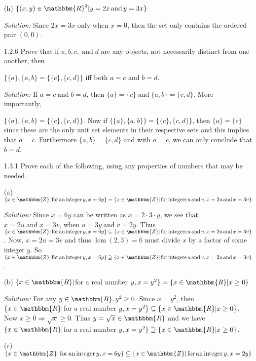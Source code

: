 \documentclass{letter}
\newcommand{\tmop}[1]{\ensuremath{\operatorname{#1}}}
\newcommand{\tmtextit}[1]{{\itshape{#1}}}
\begin{document}
(h) $\{(x, y) \in \mathbbm{R}^2 | y = 2 x \tmop{and} y = 3 x\}$

\tmtextit{Solution:} Since $2 x = 3 x$ only when $x = 0$, then the set only
contains the ordered pair $(0, 0)$.

1.2.6 Prove that if $a, b, c, \tmop{and} d$ are any objects, not necessarily
distinct from one another, then

$\{\{a\}, \{a, b\}=\{\{c\}, \{c, d\}\}$ iff both $a = c$ and $b = d$.

\tmtextit{Solution:} If $a = c \tmop{and} b = d$, then $\{a\}=\{c\} \tmop{and}
\{a, b\}=\{c, d\}$. More importantly,

$\{\{a\}, \{a, b\}=\{\{c\}, \{c, d\}\}$. Now if $\{\{a\}, \{a, b\}\}=\{\{c\},
\{c, d\}\}$, then $\{a\}=\{c\}$ since these are the only unit set elements in
their respective sets and this implies that $a = c$. Furthermore $\{a,
b\}=\{c, d\}$ and with $a = c$, we can only conclude that $b = d$.

1.3.1 Prove each of the following, using any properties of numbers that may
be needed.

(a) $\{x \in \mathbbm{Z}| \tmop{for} \tmop{an} \tmop{integer} y, x = 6 y\}=\{x
\in \mathbbm{Z}| \tmop{for} \tmop{integers} u \tmop{and} v, x = 2 u \tmop{and}
x = 3 v\}$

\tmtextit{Solution:} Since $x = 6 y$ can be written as $x = 2 \cdot 3 \cdot
y$, we see that $x = 2 u \tmop{and} x = 3 v$, when $u = 3 y \tmop{and} v = 2
y$. Thus $\{x \in \mathbbm{Z}| \tmop{for} \tmop{an} \tmop{integer} y, x = 6
y\} \subseteq \{x \in \mathbbm{Z}| \tmop{for} \tmop{integers} u \tmop{and} v,
x = 2 u \tmop{and} x = 3 v\}$. Now, $x = 2 u = 3 v$ and thus $\tmop{lcm} (2,
3) = 6$ must divide $x$ by a factor of some integer $y$. So $\{x \in
\mathbbm{Z}| \tmop{for} \tmop{an} \tmop{integer} y, x = 6 y\} \supseteq \{x
\in \mathbbm{Z}| \tmop{for} \tmop{integers} u \tmop{and} v, x = 2 u \tmop{and}
x = 3 v\}$.

(b) $\{x \in \mathbbm{R}|$for a real number $y, x = y^2 \}=\{x \in
\mathbbm{R}| x \geq 0\}$

\tmtextit{Solution:} For any $y \in \mathbbm{R}, y^2 \geq 0$. Since $x = y^2$,
then $\{x \in \mathbbm{R}|$for a real number $y, x = y^2 \} \subseteq \{x \in
\mathbbm{R}| x \geq 0\}$. Now $x \geq 0 \Rightarrow \sqrt{x} \geq 0$. Thus $y
= \sqrt{x} \in \mathbbm{R}$ and we have $\{x \in \mathbbm{R}|$for a real
number $y, x = y^2 \} \supseteq \{x \in \mathbbm{R}| x \geq 0\}$.

(c) $\{x \in \mathbbm{Z}| \tmop{for} \tmop{an} \tmop{integer} y, x = 6 y\}
\subseteq \{x \in \mathbbm{Z}| \tmop{for} \tmop{an} \tmop{integer} y, x = 2
y\}$
\end{document}
